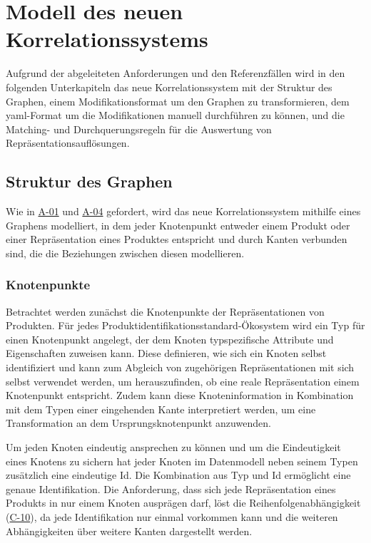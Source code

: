 \section{Modell des neuen Korrelationssystems}\label{sec:model-modellierungsansatz}

Aufgrund der abgeleiteten Anforderungen und den Referenzfällen wird in den folgenden Unterkapiteln das neue Korrelationssystem mit der Struktur des Graphen, einem Modifikationsformat um den Graphen zu transformieren, dem \acrshort{yaml}-Format um die Modifikationen manuell durchführen zu können, und die Matching- und Durchquerungsregeln für die Auswertung von Repräsentationsauflösungen.

\subsection{Struktur des Graphen}\label{subsec:model-graph-struktur}

Wie in \hyperref[subsec:req-format-product-graph]{A-01} und \hyperref[subsec:req-product-concept]{A-04} gefordert, wird das neue Korrelationssystem mithilfe eines Graphens modelliert, in dem jeder Knotenpunkt entweder einem Produkt oder einer Repräsentation eines Produktes entspricht und durch Kanten verbunden sind, die die Beziehungen zwischen diesen modellieren.

\subsubsection{Knotenpunkte}\label{subsubsec:model-graph-knoten}

Betrachtet werden zunächst die Knotenpunkte der Repräsentationen von Produkten.
Für jedes Produktidentifikationsstandard-Ökosystem wird ein Typ für einen Knotenpunkt angelegt, der dem Knoten typspezifische Attribute und Eigenschaften zuweisen kann.
Diese definieren, wie sich ein Knoten selbst identifiziert und kann zum Abgleich von zugehörigen Repräsentationen mit sich selbst verwendet werden, um herauszufinden, ob eine reale Repräsentation einem Knotenpunkt entspricht.
Zudem kann diese Knoteninformation in Kombination mit dem Typen einer eingehenden Kante interpretiert werden, um eine Transformation an dem Ursprungsknotenpunkt anzuwenden.

Um jeden Knoten eindeutig ansprechen zu können und um die Eindeutigkeit eines Knotens zu sichern hat jeder Knoten im Datenmodell neben seinem Typen zusätzlich eine eindeutige Id.
Die Kombination aus Typ und Id ermöglicht eine genaue Identifikation.
Die Anforderung, dass sich jede Repräsentation eines Produkts in nur einem Knoten ausprägen darf, löst die Reihenfolgenabhängigkeit (\hyperref[subsec:c-10-order-dependency]{C-10}), da jede Identifikation nur einmal vorkommen kann und die weiteren Abhängigkeiten über weitere Kanten dargestellt werden.

